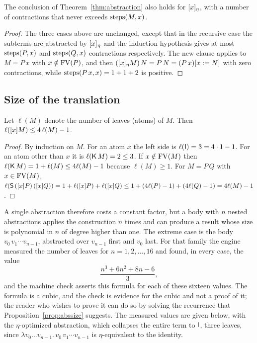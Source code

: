 \begin{theorem}\label{thm:eta}
The conclusion of Theorem~\ref{thm:abstraction} also holds for $[x]_\eta$, with a number of contractions that never exceeds $\mathrm{steps}(M,x)$.
\end{theorem}

\begin{proof}
The three cases above are unchanged, except that in the recursive case the subterms are abstracted by $[x]_\eta$ and the induction hypothesis gives at most $\mathrm{steps}(P,x)$ and $\mathrm{steps}(Q,x)$ contractions respectively. The new clause applies to $M=P\,x$ with $x\notin\mathrm{FV}(P)$, and then $([x]_\eta M)\,N=P\,N=(P\,x)[x:=N]$ with zero contractions, while $\mathrm{steps}(P\,x,x)=1+1+2$ is positive.
\end{proof}

\subsection{Size of the translation}

\begin{proposition}\label{prop:abssize}
Let $\ell(M)$ denote the number of leaves (atoms) of $M$. Then $\ell([x]M)\le4\,\ell(M)-1$.
\end{proposition}

\begin{proof}
By induction on $M$. For an atom $x$ the left side is $\ell(\mathsf{I})=3=4\cdot1-1$. For an atom other than $x$ it is $\ell(\mathsf{K}\,M)=2\le3$. If $x\notin\mathrm{FV}(M)$ then $\ell(\mathsf{K}\,M)=1+\ell(M)\le4\ell(M)-1$ because $\ell(M)\ge1$. For $M=P\,Q$ with $x\in\mathrm{FV}(M)$, $\ell(\mathsf{S}\,([x]P)\,([x]Q))=1+\ell([x]P)+\ell([x]Q)\le1+(4\ell(P)-1)+(4\ell(Q)-1)=4\ell(M)-1$.
\end{proof}

A single abstraction therefore costs a constant factor, but a body with $n$ nested abstractions applies the construction $n$ times and can produce a result whose size is polynomial in $n$ of degree higher than one. The extreme case is the body $v_0\,v_1\cdots v_{n-1}$, abstracted over $v_{n-1}$ first and $v_0$ last. For that family the engine measured the number of leaves for $n=1,2,\dots,16$ and found, in every case, the value
\[
\frac{n^3+6n^2+8n-6}{3},
\]
and the machine check asserts this formula for each of these sixteen values. The formula is a cubic, and the check is evidence for the cubic and not a proof of it; the reader who wishes to prove it can do so by solving the recurrence that Proposition~\ref{prop:abssize} suggests. The measured values are given below, with the $\eta$-optimized abstraction, which collapses the entire term to $\mathsf{I}$, three leaves, since $\lambda v_0\dots v_{n-1}.\,v_0\,v_1\cdots v_{n-1}$ is $\eta$-equivalent to the identity.

